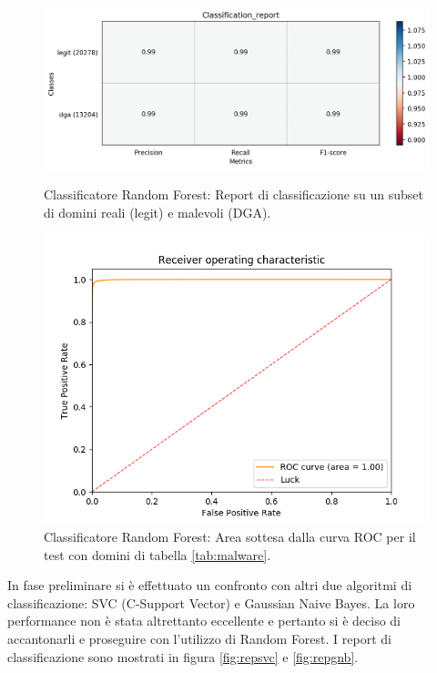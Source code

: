 \begin{figure}[!htbp]
    \centering
    \includegraphics[width=.85\columnwidth]{figures/rndf_tra_nosup_nosup/class_rep.png}
    \caption{Classificatore Random Forest: Report di classificazione su un subset di domini reali (legit) e malevoli (DGA).\label{fig:repdga}}

    \centering
    \includegraphics[width=.85\columnwidth]{figures/rndf_tra_nosup_nosup/roc_plot.png}
    \caption{Classificatore Random Forest: Area sottesa dalla curva ROC per il test con domini di tabella \ref{tab:malware}.\label{fig:rocdga}}
\end{figure}

In fase preliminare si è effettuato un confronto con altri due algoritmi di classificazione: SVC (C-Support Vector) e Gaussian Naive Bayes. La loro performance non è stata altrettanto eccellente e pertanto si è deciso di accantonarli e proseguire con l'utilizzo di Random Forest. I report di classificazione sono mostrati in figura \ref{fig:repsvc} e \ref{fig:repgnb}.

